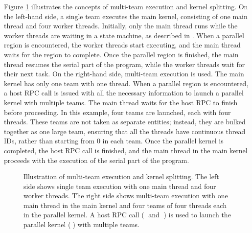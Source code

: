 Figure \ref{fig:parallel-kernel} illustrates the concepts of multi-team execution and kernel splitting.
On the left-hand side, a single team executes the main kernel, consisting of one main thread and four worker threads.
Initially, only the main thread runs while the worker threads are waiting in a state machine, as described in \cite{DBLP:conf/cgo/HuberCGTDDCD22}.
When a parallel region is encountered, the worker threads start executing, and the main thread waits for the region to complete.
Once the parallel region is finished, the main thread resumes the serial part of the program, while the worker threads wait for their next task.
On the right-hand side, multi-team execution is used.
The main kernel has only one team with one thread.
When a parallel region is encountered, a host RPC call is issued with all the necessary information to launch a parallel kernel with multiple teams.
The main thread waits for the host RPC to finish before proceeding.
In this example, four teams are launched, each with four threads.
These teams are not taken as separate entities; instead, they are bulked together as one large team, ensuring that all the threads have continuous thread IDs, rather than starting from 0 in each team.
Once the parallel kernel is completed, the host RPC call is finished, and the main thread in the main kernel proceeds with the execution of the serial part of the program.

\begin{figure}[htb]
\vspace{-2mm}
\resizebox{0.9\linewidth}{!}{

}
\vspace{-2mm}
\caption{Illustration of multi-team execution and kernel splitting.
The left side shows single team execution with one main thread and four worker threads.
The right side shows multi-team execution with one main thread in the main kernel and four teams of four threads each in the parallel kernel.
A host RPC call (\textcircled{\raisebox{-.7pt}{1}} and \textcircled{\raisebox{-.7pt}{3}}) is used to launch the parallel kernel (\textcircled{\raisebox{-.7pt}{2}}) with multiple teams.}
\label{fig:parallel-kernel}
\end{figure}


